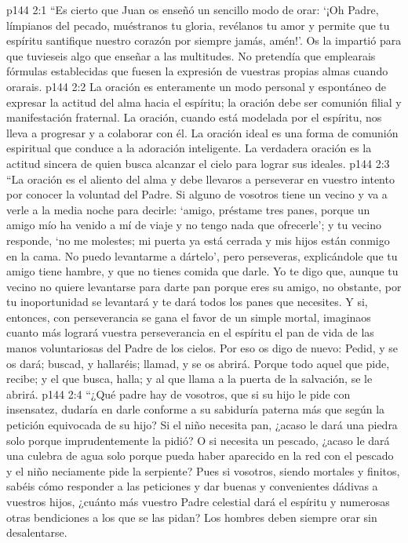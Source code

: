 \vs p144 2:1 “Es cierto que Juan os enseñó un sencillo modo de orar: ‘¡Oh Padre, límpianos del pecado, muéstranos tu gloria, revélanos tu amor y permite que tu espíritu santifique nuestro corazón por siempre jamás, amén!’. Os la impartió para que tuvieseis algo que enseñar a las multitudes. No pretendía que emplearais fórmulas establecidas que fuesen la expresión de vuestras propias almas cuando orarais.
\vs p144 2:2 La oración es enteramente un modo personal y espontáneo de expresar la actitud del alma hacia el espíritu; la oración debe ser comunión filial y manifestación fraternal. La oración, cuando está modelada por el espíritu, nos lleva a progresar y a colaborar con él. La oración ideal es una forma de comunión espiritual que conduce a la adoración inteligente. La verdadera oración es la actitud sincera de quien busca alcanzar el cielo para lograr sus ideales.
\vs p144 2:3 “La oración es el aliento del alma y debe llevaros a perseverar en vuestro intento por conocer la voluntad del Padre. Si alguno de vosotros tiene un vecino y va a verle a la media noche para decirle: ‘amigo, préstame tres panes, porque un amigo mío ha venido a mí de viaje y no tengo nada que ofrecerle’; y tu vecino responde, ‘no me molestes; mi puerta ya está cerrada y mis hijos están conmigo en la cama. No puedo levantarme a dártelo’, pero perseveras, explicándole que tu amigo tiene hambre, y que no tienes comida que darle. Yo te digo que, aunque tu vecino no quiere levantarse para darte pan porque eres su amigo, no obstante, por tu inoportunidad se levantará y te dará todos los panes que necesites. Y si, entonces, con perseverancia se gana el favor de un simple mortal, imaginaos cuanto más logrará vuestra perseverancia en el espíritu el pan de vida de las manos voluntariosas del Padre de los cielos. Por eso os digo de nuevo: Pedid, y se os dará; buscad, y hallaréis; llamad, y se os abrirá. Porque todo aquel que pide, recibe; y el que busca, halla; y al que llama a la puerta de la salvación, se le abrirá.
\vs p144 2:4 “¿Qué padre hay de vosotros, que si su hijo le pide con insensatez, dudaría en darle conforme a su sabiduría paterna más que según la petición equivocada de su hijo? Si el niño necesita pan, ¿acaso le dará una piedra solo porque imprudentemente la pidió? O si necesita un pescado, ¿acaso le dará una culebra de agua solo porque pueda haber aparecido en la red con el pescado y el niño neciamente pide la serpiente? Pues si vosotros, siendo mortales y finitos, sabéis cómo responder a las peticiones y dar buenas y convenientes dádivas a vuestros hijos, ¿cuánto más vuestro Padre celestial dará el espíritu y numerosas otras bendiciones a los que se las pidan? Los hombres deben siempre orar sin desalentarse.
